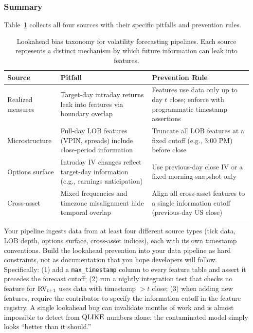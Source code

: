 \subsubsection{Summary}

Table~\ref{tab:lookahead-taxonomy} collects all four sources with their specific pitfalls and prevention rules.

\begin{table}[ht]
\centering
\caption{Lookahead bias taxonomy for volatility forecasting pipelines.
Each source represents a distinct mechanism by which future information can leak into features.}
\label{tab:lookahead-taxonomy}
\small
\begin{tabular}{@{}p{2.2cm}p{5.0cm}p{5.5cm}@{}}
\toprule
\textbf{Source} & \textbf{Pitfall} & \textbf{Prevention Rule} \\
\midrule
Realized measures
  & Target-day intraday returns leak into features via boundary overlap
  & Features use data only up to day $t$ close; enforce with programmatic timestamp assertions \\
\addlinespace
Microstructure
  & Full-day LOB features (VPIN, spreads) include close-period information
  & Truncate all LOB features at a fixed cutoff (e.g., 3:00 PM) before close \\
\addlinespace
Options surface
  & Intraday IV changes reflect target-day information (e.g., earnings anticipation)
  & Use previous-day close IV or a fixed morning snapshot only \\
\addlinespace
Cross-asset
  & Mixed frequencies and timezone misalignment hide temporal overlap
  & Align all cross-asset features to a single information cutoff (previous-day US close) \\
\bottomrule
\end{tabular}
\end{table}

\begin{projectconnection}
Your pipeline ingests data from at least four different source types (tick data, LOB depth, options surface, cross-asset indices), each with its own timestamp conventions.
Build the lookahead prevention into your data pipeline as hard constraints, not as documentation that you hope developers will follow.
Specifically:
(1) add a \texttt{max\_timestamp} column to every feature table and assert it precedes the forecast cutoff;
(2) run a nightly integration test that checks no feature for $\operatorname{RV}_{t+1}$ uses data with timestamp $> t$ close;
(3) when adding new features, require the contributor to specify the information cutoff in the feature registry.
A single lookahead bug can invalidate months of work and is almost impossible to detect from $\operatorname{QLIKE}$ numbers alone: the contaminated model simply looks ``better than it should.''
\end{projectconnection}


